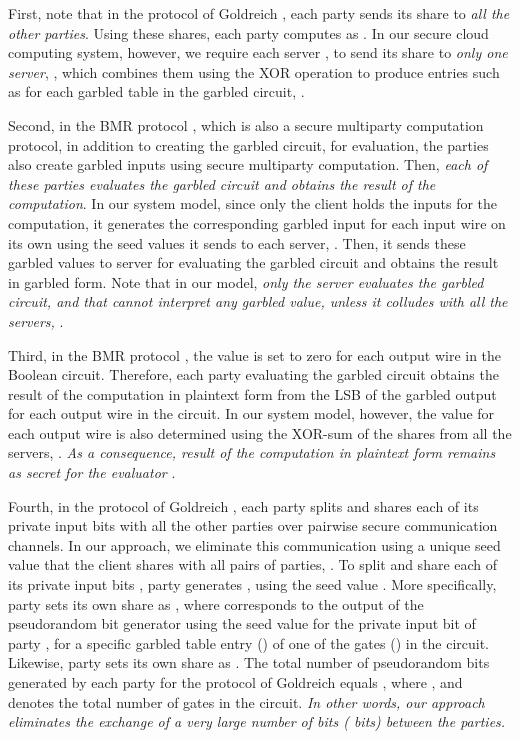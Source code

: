 \documentclass[10pt,journal,cspaper,compsoc]{IEEEtran}
\begin{document}
First, note that in the protocol of Goldreich \cite{goldreich04,goldreich87}, each party  sends its share  to {\em all the other parties}. Using these shares, each party computes  as . In our secure cloud computing system, however, we require each server , to send its share to {\em only one server}, , which combines them using the XOR operation to produce entries such as  for each garbled table in the garbled circuit, .


Second, in the BMR protocol \cite{beaver90,rogaway91}, which is also a secure multiparty computation protocol, in addition to creating the garbled circuit, for evaluation, the  parties also create garbled inputs using secure multiparty computation. Then, {\em each of these  parties evaluates the garbled circuit and obtains the result of the computation}. In our system model, since only the client holds the inputs for the computation, it generates the corresponding garbled input for each input wire on its own using the seed values it sends to each server, . Then, it sends these garbled values to server  for evaluating the garbled circuit and obtains the result in garbled form. Note that in our model, {\em only the server  evaluates the garbled circuit, and
that  cannot interpret any garbled value, unless it colludes with all the  servers, }.


Third, in the BMR protocol \cite{beaver90,rogaway91}, the  value is set to zero for each output wire in the Boolean circuit. Therefore, each party evaluating the garbled circuit obtains the result of the computation in plaintext form from the LSB of the garbled output for each output wire in the circuit. In our system model, however, the  value for each output wire is also determined using the XOR-sum of the shares from all the  servers, . {\em As a consequence, result of the computation in plaintext form remains as secret for the evaluator }.


Fourth, in the protocol of Goldreich \cite{goldreich04,goldreich87}, each party splits and shares each of its private input bits with all the other parties over pairwise secure communication channels. In our approach, we eliminate this communication using a unique seed value  that the client shares with all pairs of parties, . To split and share each of its  private input bits , party  generates , using the seed value . More specifically, party  sets its own share as , where  corresponds to the output of the pseudorandom bit generator using the seed value  for the  private input bit of party , for a specific garbled table entry () of one of the gates () in the circuit. Likewise, party  sets its own share as . The total number of pseudorandom bits generated by each party for the protocol of Goldreich equals , where , and  denotes the total number of gates in the circuit. {\em In other words, our approach eliminates the exchange of a very large number of bits ( bits) between the  parties.}
\end{document}

